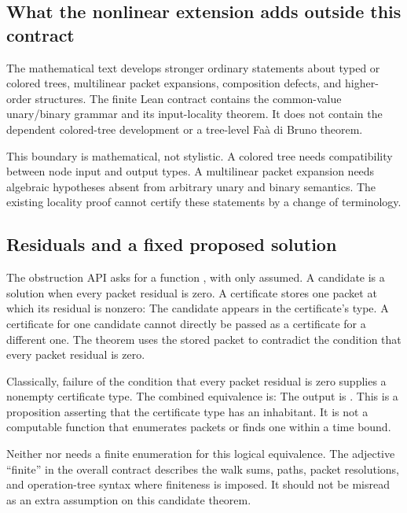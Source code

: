 \subsection{What the nonlinear extension adds outside this contract}
The mathematical text develops stronger ordinary statements about typed or colored trees, multilinear packet expansions, composition defects, and higher-order structures. The finite Lean contract contains the common-value unary/binary grammar and its input-locality theorem. It does not contain the dependent colored-tree development or a tree-level Faà di Bruno theorem.

This boundary is mathematical, not stylistic. A colored tree needs compatibility between node input and output types. A multilinear packet expansion needs algebraic hypotheses absent from arbitrary unary and binary semantics. The existing locality proof cannot certify these statements by a change of terminology.

\subsection{Residuals and a fixed proposed solution}
The obstruction API asks for a function
, with only  assumed. A candidate is a solution when every packet residual is zero. A certificate stores one packet at which its residual is nonzero:
The candidate appears in the certificate's type. A certificate for one candidate cannot directly be passed as a certificate for a different one. The theorem  uses the stored packet to contradict the condition that every packet residual is zero.

Classically, failure of the condition that every packet residual is zero supplies a nonempty certificate type. The combined equivalence is:
The output is . This is a proposition asserting that the certificate type has an inhabitant. It is not a computable function that enumerates packets or finds one within a time bound.

Neither  nor  needs a finite enumeration for this logical equivalence. The adjective ``finite'' in the overall contract describes the walk sums, paths, packet resolutions, and operation-tree syntax where finiteness is imposed. It should not be misread as an extra  assumption on this candidate theorem.

